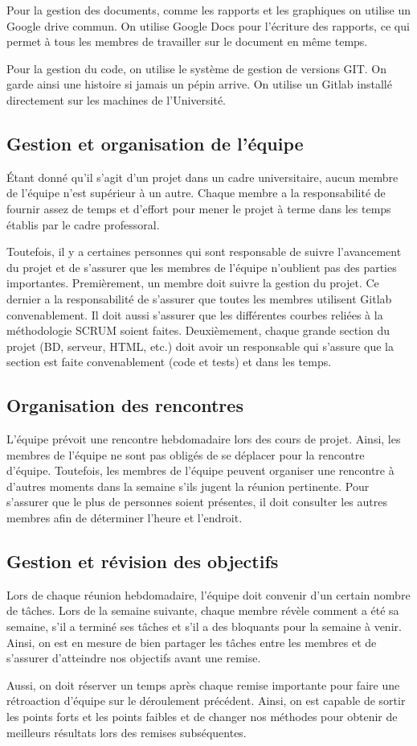 	Pour la gestion des documents, comme les rapports et les graphiques on utilise un Google drive commun. On utilise Google Docs pour l’écriture des rapports, ce qui permet à tous les membres de travailler sur le document en même temps.
 
	Pour la gestion du code, on utilise le système de gestion de versions GIT. On garde ainsi une histoire si jamais un pépin arrive. On utilise un Gitlab installé directement sur les machines de l’Université. 

	\subsection{Gestion et organisation de l'équipe}
	Étant donné qu'il s'agit d'un projet dans un cadre universitaire, aucun membre de l’équipe n'est supérieur à un autre. Chaque membre a la responsabilité de fournir assez de temps et d’effort pour mener le projet à terme dans les temps établis par le cadre professoral.
 
	Toutefois, il y a certaines personnes qui sont responsable de suivre l’avancement du projet et de s’assurer que les membres de l’équipe n’oublient pas des parties importantes. Premièrement, un membre doit suivre la gestion du projet. Ce dernier a la responsabilité de s’assurer que toutes les membres utilisent Gitlab convenablement. Il doit aussi s’assurer que les différentes courbes reliées à la méthodologie SCRUM soient faites. Deuxièmement, chaque grande section du projet (BD, serveur, HTML, etc.) doit avoir un responsable qui s’assure que la section est faite convenablement (code et tests) et dans les temps.

	\subsection{Organisation des rencontres}
	L’équipe prévoit une rencontre hebdomadaire lors des cours de projet. Ainsi, les membres de l’équipe ne sont pas obligés de se déplacer pour la rencontre d’équipe. Toutefois, les membres de l’équipe peuvent organiser une rencontre à d’autres moments dans la semaine s’ils jugent la réunion pertinente. Pour s’assurer que le plus de personnes soient présentes, il doit consulter les autres membres afin de déterminer l’heure et l’endroit.

	\subsection{Gestion et révision des objectifs}
	Lors de chaque réunion hebdomadaire, l’équipe doit convenir d'un certain nombre de tâches. Lors de la semaine suivante, chaque membre révèle comment a été sa semaine, s’il a terminé ses tâches et s’il a des bloquants pour la semaine à venir. Ainsi, on est en mesure de bien partager les tâches entre les membres et de s’assurer d’atteindre nos objectifs avant une remise.

	Aussi, on doit réserver un temps après chaque remise importante pour faire une rétroaction d’équipe sur le déroulement précédent. Ainsi, on est capable de sortir les points forts et les points faibles et de changer nos méthodes pour obtenir de meilleurs résultats lors des remises subséquentes.
